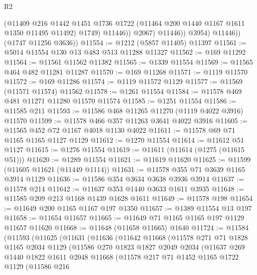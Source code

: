 \begin{lexlean}{R2}
\begin{coremodule}
                      (@11409
                        @216
                        @1442
                        @1451
                        @1736
                        @1722
                        (@11464 @200 @1440 @1167 @1611 @1350 @11495 @11492)
                        @1749)
                      @11446))
                  @2067)
                @11446))
            @3954)
          @11446))
      (@1747 @11256 @3636))
@11554 := @1212 (@5857 @11405) @11397
@11561 := @5014 @11554 @130 @13 @483 @513 @11288 @11327
@11562 := @169 @11292
@11564 := @11561 @11562 @11382
@11565 := @1339 @11554
@11569 := @11565 @464 @482 @11281 @11287
@11570 := @169 @11268
@11571 := @1119 @11570
@11572 := @169 @11286
@11574 := @1119 @11572 @1129
@11577 := @11569 (@11571 @11574) @11562
@11578 := @1261 @11554
@11584 := @11578 @469 @481 @11271 @11280 @11570 @11574
@11585 := @1251 @11554
@11586 := @11585 @211
@11593 := @11586 @468 @11265 @11270 (@1119 @4022 @3916) @11570
@11599 := @11578 @466 @357 @11263 @3641 @4022 @3916
@11605 := @11565 @452 @72 @1167 @4018 @1130 @4022
@11611 := @11578 @69 @71 @1165 @1165 @1127 @1129
@11612 := @1270 @11554
@11614 := @11612 @51 @1127
@11615 := @1276 @11554
@11619 := @11611 (@11614 (@1275 (@11615 @51)))
@11620 := @1289 @11554
@11621 := @11619 @11620
@11625 := @11599 (@11605 @11621 (@11449 @1114))
@11631 := @11578 @355 @71 @3639 @1165 @3914 @1129
@11636 := @11586 @354 @3634 @3638 @3936 @3914
@11637 := @11578 @214
@11642 := @11637 @353 @1440 @3633 @1611 @3935
@11648 := @11585 @209 @213 @1168 @1439 @1628 @1611
@11649 := @11578 @198
@11654 := @11649 @200 @1165 @1167 @197 @1350
@11657 := @1389 @11554 @13 @197
@11658 := @11654 @11657
@11665 := @11649 @71 @1165 @1165 @197 @1129 @11657 @11620
@11668 := @11648 (@11658 @11665) @1640
@11724 := @11584
    (@11593
      (@11625
        (@11631
          (@11636
            (@11642
              @11668
              (@11578
                @271
                @71
                @1828
                @1165
                @2034
                @1129
                (@11586
                  @270
                  @1823
                  @1827
                  @2049
                  @2034
                  (@11637
                    @269
                    @1440
                    @1822
                    @1611
                    @2048
                    @11668
                    (@11578
                      @217
                      @71
                      @1452
                      @1165
                      @1722
                      @1129
                      (@11586
                        @216

\end{coremodule}
\end{lexlean}
